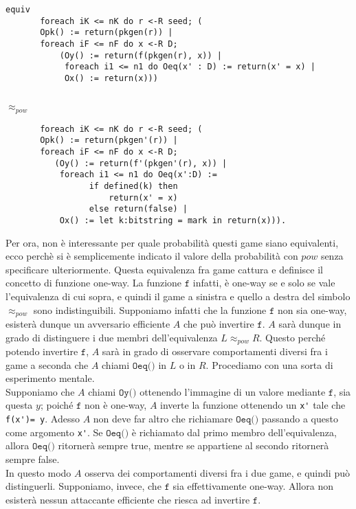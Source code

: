 \documentclass[a4paper,openright,twoside,12pt]{report}
\begin{document}
\begin{verbatim}
equiv 
       foreach iK <= nK do r <-R seed; (
       Opk() := return(pkgen(r)) |
       foreach iF <= nF do x <-R D;
           (Oy() := return(f(pkgen(r), x)) |
            foreach i1 <= n1 do Oeq(x' : D) := return(x' = x) |
            Ox() := return(x)))
   
\end{verbatim}
\texttt{$\approx _{pow}$} 
\begin{verbatim}       
       foreach iK <= nK do r <-R seed; (
       Opk() := return(pkgen'(r)) |
       foreach iF <= nF do x <-R D;
          (Oy() := return(f'(pkgen'(r), x)) |
           foreach i1 <= n1 do Oeq(x':D) :=
                 if defined(k) then 
                     return(x' = x) 
                 else return(false) |
           Ox() := let k:bitstring = mark in return(x))).
 \end{verbatim}
Per ora, non \`e interessante per quale probabilit\`a questi game siano equivalenti, ecco perch\`e si \`e semplicemente indicato il valore della probabilit\`a con $pow$ senza specificare ulteriormente.
Questa equivalenza fra game cattura e definisce il concetto di funzione one-way. La funzione $\texttt{f}$ infatti, \`e one-way se e solo se vale l'equivalenza di cui sopra, 
e quindi il game a sinistra e quello a destra del simbolo \textbf{$\approx _{pow}$} sono indistinguibili.
Supponiamo infatti che la funzione $\texttt{f}$ non sia one-way, esister\`a dunque un avversario efficiente $A$ 
che pu\`o invertire $\texttt{f}$. $A$ sar\`a dunque in grado di distinguere i due membri dell'equivalenza $L \approx_{pow} R$. 
Questo perch\'e potendo invertire $\texttt{f}$, $A$ sar\`a in grado di osservare comportamenti diversi fra i game a seconda che $A$ chiami $\texttt{Oeq()}$ in $L$ o in $R$.
Procediamo con una sorta di esperimento mentale.\\ 
Supponiamo che $A$ chiami $\texttt{Oy()}$ ottenendo l'immagine di un valore mediante $\texttt{f}$, sia questa $y$; poich\'e $\texttt{f}$ non \`e one-way, 
$A$ inverte la funzione ottenendo un \verb!x'! tale che \verb!f(x')= y!.
Adesso $A$ non deve far altro che richiamare $\texttt{Oeq()}$ passando a questo come argomento \verb!x'!. Se $\texttt{Oeq()}$ \`e richiamato dal primo membro dell'equivalenza, 
allora $\texttt{Oeq()}$ ritorner\`a sempre true, mentre se appartiene al secondo ritorner\`a sempre false.\\
In questo modo $A$ osserva dei comportamenti diversi fra i due game, e quindi pu\`o distinguerli. 
Supponiamo, invece, che $\texttt{f}$ sia effettivamente one-way. Allora non esister\`a nessun attaccante efficiente che riesca ad invertire $\texttt{f}$.
\end{document}
